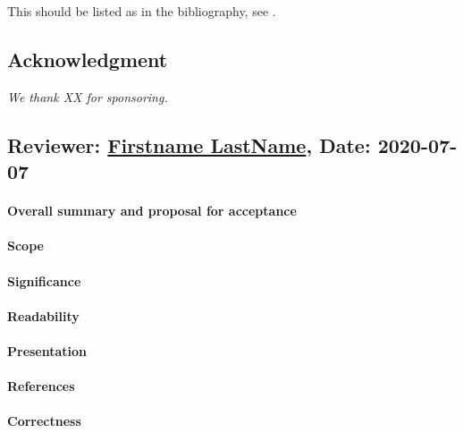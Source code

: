\documentclass{jhps}
\begin{document}
This should be listed as in the bibliography, see .
\begin{lstfloat}[h]

\end{lstfloat}

\subsection*{Acknowledgment} %
\textit{We thank XX for sponsoring.}



\reviews   %

\subsection*{Reviewer: \href{Optional URL to reviewer page}{Firstname LastName}, Date: 2020-07-07}

\paragraph{Overall summary and proposal for acceptance}

\paragraph{Scope}   %

\paragraph{Significance}   %

\paragraph{Readability}   %

\paragraph{Presentation}

\paragraph{References}   %

\paragraph{Correctness}   %
\end{document}
